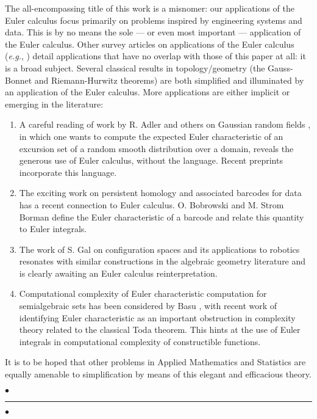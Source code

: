 \documentclass{psapm-l}
\theoremstyle{definition}
\theoremstyle{remark}
\numberwithin{equation}{section}
\begin{document}
The all-encompassing title of this work is a misnomer: our applications of the Euler calculus focus primarily on problems inspired by engineering systems and data. This is by no means the sole --- or even most important --- application of the Euler calculus. Other survey articles on applications of the Euler calculus ({{\em e.g.}}, \cite{GZ}) detail applications that have no overlap with those of this paper at all: it is a broad subject. Several classical results in topology/geometry (the Gauss-Bonnet and Riemann-Hurwitz theorems) are both simplified and illuminated by an application of the Euler calculus. More applications are either implicit or emerging in the literature:
\begin{enumerate}
\item A careful reading of work by R. Adler and others on Gaussian random fields \cite{Adler,AT}, in which one wants to compute the expected Euler characteristic of an excursion set of a random smooth distribution over a domain, reveals the generous use of Euler calculus, without the language. Recent preprints \cite{Adler+,BoBo} incorporate this language.
\item The exciting work on persistent homology and associated barcodes for data \cite{CZ,Carlsson,G:barcodes} has a recent connection to Euler calculus. O. Bobrowski and M. Strom Borman \cite{BoBo} define the Euler characteristic of a barcode and relate this quantity to Euler integrals.
\item The work of S. Gal on configuration spaces \cite{Gal} and its applications to robotics \cite{Farberbook} resonates with similar constructions in the algebraic geometry literature \cite{GZ} and is clearly awaiting an Euler calculus reinterpretation.
\item Computational complexity of Euler characteristic computation for semialgebraic sets has been considered by Basu \cite{Basu1}, with recent work of \cite{Basu2} identifying Euler characteristic as an important obstruction in complexity theory related to the classical Toda theorem. This hints at the use of Euler integrals in computational complexity of constructible functions.
\end{enumerate}
It is to be hoped that other problems in Applied Mathematics and Statistics are equally amenable to simplification by means of this elegant and efficacious theory.

{
\begin{center}
\nointerlineskip\vspace{-0.04in}
        $\bullet$\hfill\rule{0.77\linewidth}{1.0pt}\hfill$\bullet$
\par\nointerlineskip\vspace{-0.01in}
\end{center}
}
\end{document}
